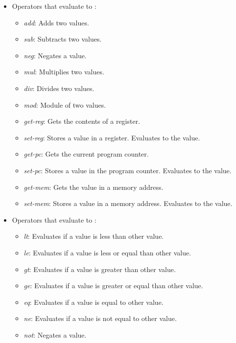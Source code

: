 \begin{itemize}
  \item Operators that evaluate to :
  \begin{itemize}
    \item \textit{add}: Adds two values.
    \item \textit{sub}: Subtracts two values.
    \item \textit{neg}: Negates a value.
    \item \textit{mul}: Multiplies two values.
    \item \textit{div}: Divides two values.
    \item \textit{mod}: Module of two values.
    \item \textit{get-reg}: Gets the contents of a \gls{register}.
    \item \textit{set-reg}: Stores a value in a \gls{register}. Evaluates to the value.
    \item \textit{get-pc}: Gets the current \gls{program counter}.
    \item \textit{set-pc}: Stores a value in the \gls{program counter}. Evaluates to the value.
    \item \textit{get-mem}: Gets the value in a memory address.
    \item \textit{set-mem}: Stores a value in a memory address. Evaluates to the value.
  \end{itemize}
  \item Operators that evaluate to :
  \begin{itemize}
    \item \textit{lt}: Evaluates if a value is less than other value.
    \item \textit{le}: Evaluates if a value is less or equal than other value.
    \item \textit{gt}: Evaluates if a value is greater than other value.
    \item \textit{ge}: Evaluates if a value is greater or equal than other value.
    \item \textit{eq}: Evaluates if a value is equal to other value.
    \item \textit{ne}: Evaluates if a value is not equal to other value.
    \item \textit{not}: Negates a value.
  \end{itemize}
\end{itemize}


